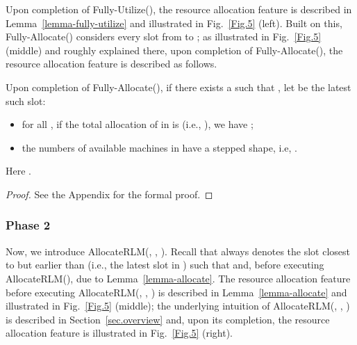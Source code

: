 \documentclass[10pt,journal,compsoc]{IEEEtran}
\begin{document}
Upon completion of Fully-Utilize(), the resource allocation feature is described in Lemma~\ref{lemma-fully-utilize} and illustrated in Fig.~\ref{Fig.5} (left). Built on this, Fully-Allocate() considers every slot from  to ; as illustrated in Fig.~\ref{Fig.5} (middle) and roughly explained there, upon completion of Fully-Allocate(), the resource allocation feature is described as follows.



\begin{lemma}\label{lemma-allocate}
Upon completion of Fully-Allocate(), if there exists a  such that , let  be the latest such slot:
\begin{itemize}
 \setlength\itemsep{0.2em}

  \item for all , if the total allocation of  in  is  (i.e., ), we have ;

  \item the numbers of available machines in  have a stepped shape, i.e, .
\end{itemize}
Here .
\end{lemma}
\begin{proof}
See the Appendix for the formal proof.
\end{proof}





\subsubsection{Phase 2}
\label{sec.phase-2}




Now, we introduce AllocateRLM(, , ). Recall that  always denotes the slot closest to but earlier than  (i.e., the latest slot in ) such that  and, before executing AllocateRLM(),  due to Lemma~\ref{lemma-allocate}. The resource allocation feature before executing AllocateRLM(, , ) is described in Lemma~\ref{lemma-allocate} and illustrated in Fig.~\ref{Fig.5} (middle); the underlying intuition of AllocateRLM(, , ) is described in Section~\ref{sec.overview} and, upon its completion, the resource allocation feature is illustrated in Fig.~\ref{Fig.5} (right).
\end{document}
